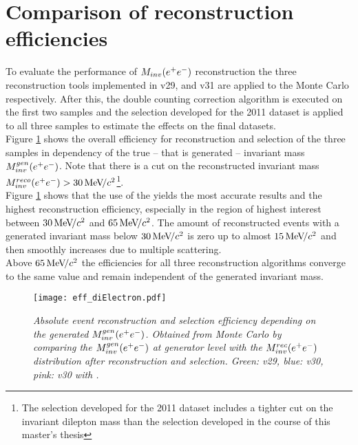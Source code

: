 \section{Comparison of reconstruction efficiencies}
To evaluate the performance of $M_{inv}(e^+e^-)$ reconstruction the three reconstruction tools implemented in \davinci v29,  and \davinci v31 are applied to the \BdKstee \lhcb Monte Carlo respectively. After this, the double counting correction algorithm is executed on the first two samples and the selection developed for the 2011 dataset \cite{michellesthesis} \cite{paper} is applied to all three samples to estimate the effects on the final datasets.\\
Figure \ref{fig:eff_diElectron} shows the overall efficiency for reconstruction and selection of the three samples in dependency of the true -- that is generated -- invariant \epem mass $M^{gen}_{inv}(e^+e^-)$. Note that there is a cut on the reconstructed invariant \epem mass $M^{reco}_{inv}(e^+e^-)>30 {\mathrm{\,Me\kern -0.1em V\!/}c^2}$\footnote{The selection developed for the 2011 dataset \cite{michellesthesis} \cite{paper} includes a tighter cut on the invariant dilepton mass than the selection developed in the course of this master's thesis}.\\
Figure \ref{fig:eff_diElectron} shows that the use of the \dielectronmaker yields the most accurate results and the highest reconstruction efficiency, especially in the region of highest interest between $30 {\mathrm{\,Me\kern -0.1em V\!/}c^2}$ and $65 {\mathrm{\,Me\kern -0.1em V\!/}c^2}$. The amount of reconstructed events with a generated invariant mass below $30 {\mathrm{\,Me\kern -0.1em V\!/}c^2}$ is zero up to almost $15 {\mathrm{\,Me\kern -0.1em V\!/}c^2}$ and then smoothly increases due to multiple scattering.\\
Above $65 {\mathrm{\,Me\kern -0.1em V\!/}c^2}$ the efficiencies for all three reconstruction algorithms converge to the same value and remain independent of the generated invariant \epem mass.\newpage
\begin{figure}[!h]
  \begin{center}
    \texttt{[image: eff\_diElectron.pdf]}
  \vspace*{-0.5cm}
  \end{center}
  \caption{\textit{Absolute event reconstruction and selection efficiency depending on the generated $M^{gen}_{inv}(e^+e^-)$. Obtained from \BdKstee Monte Carlo by comparing the $M^{gen}_{inv}(e^+e^-)$ at generator level with the $M^{rec}_{inv}(e^+e^-)$ distribution after reconstruction and selection. Green: \davinci v29, blue: \davinci v30, pink: \davinci v30 with \dielectronmaker .}}
  \label{fig:eff_diElectron}
\end{figure}
\vspace*{10cm}


